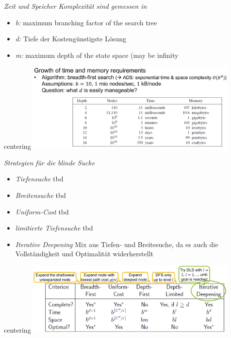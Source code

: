 \documentclass{article}
\newenvironment{Figure}
	{\par\medskip\noindent\minipage{\linewidth}}
	{\endminipage\par\medskip}
\theoremstyle{merke}
\theoremstyle{definition}
\begin{document}
\textit{Zeit und Speicher Komplexität sind gemessen in}\\
\begin{itemize}
\item{\textit{b:} maximum branching factor of the search tree}
\item{\textit{d:} Tiefe der Kostengünstigste Lösung}
\item{\textit{m:} maximum depth of the state space (may be infinity}
\end{itemize}
\begin{Figure}
centering
\includegraphics[width=400px]{img/uninformedSearch.png}
	\label{fig:Live Beispiel einer blinden Suche}
\end{Figure}

\textit{Strategien für die blinde Suche}\\
\begin{itemize}
\item{\textit{Tiefensuche} tbd}
\item{\textit{Breitensuche} tbd}
\item{\textit{Uniform-Cost} tbd}
\item{\textit{limitierte Tiefensuche} tbd}
\item{\textit{Iterative Deepening} Mix aus Tiefen- und Breitesuche, da es auch die Vollständigkeit und Optimalität widerherstellt}
\end{itemize}
\begin{Figure}
centering
\includegraphics[width=400px]{img/uninformedSearchStrategies.png}
	\label{fig:unterschiedliche Strategien für die blinde Suche}
\end{Figure}
\end{document}
